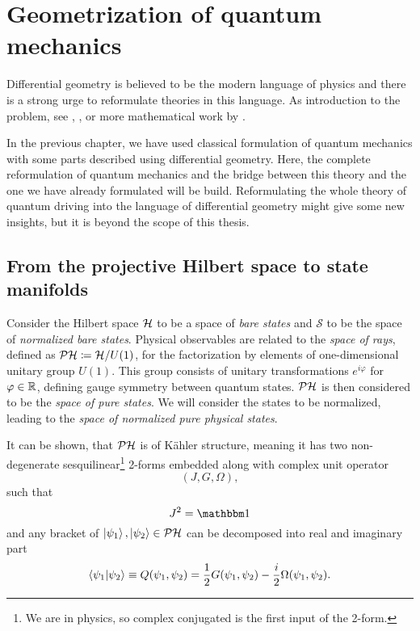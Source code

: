 \chapter{Geometrization of quantum mechanics}
\label{appendixGEOM}
Differential geometry is believed to be the modern language of physics and there is a strong urge to reformulate theories in this language. As introduction to the problem, see \cite{ashtekar_geometrical_1997}, \cite{ashtekar_geometry_1995}, or more mathematical work by \cite{molitor_exponential_2013}.

In the previous chapter, we have used classical formulation of quantum mechanics with some parts described using differential geometry. Here, the complete reformulation of quantum mechanics and the bridge between this theory and the one we have already formulated will be build. Reformulating the whole theory of quantum driving into the language of differential geometry might give some new insights, but it is beyond the scope of this thesis.




\section{From the projective Hilbert space to state manifolds}


Consider the Hilbert space $\mathcal{H}$ to be a space of \emph{bare states} and $\mathcal{S}$ to be the space of \emph{normalized bare states}. Physical observables are related to the \emph{space of rays}, defined as $\mathcal{PH}\coloneqq \mathcal{H}/U(1)$, for the factorization by elements of one-dimensional unitary group $U(1)$. This group consists of unitary transformations $e^{i\varphi}$ for $\varphi\in\mathbb{R}$, defining gauge symmetry between quantum states. $\mathcal{PH}$ is then considered to be the \emph{space of pure states}. We will consider the states to be normalized, leading to the \emph{space of normalized pure physical states}. 

It can be shown, that $\mathcal{PH}$ is of K\"ahler structure, meaning it has two non-degenerate sesquilinear\footnote{We are in physics, so complex conjugated is the first input of the 2-form.} 2-forms embedded along with complex unit operator
$$(J, G, \Omega),$$
such that
\begin{equation}
    J^2=\Id
\end{equation}
and any bracket of $\ket{\psi_1},\ket{\psi_2}\in \mathcal{PH}$ can be decomposed into real and imaginary part\citep{ashtekar_geometrical_1997}
\begin{equation}
    \braket{\psi_1|\psi_2}\equiv Q(\psi_1,\psi_2)=\frac{1}{2}G(\psi_1,\psi_2)-\frac{i}{2}\Omega(\psi_1,\psi_2).
\end{equation}


